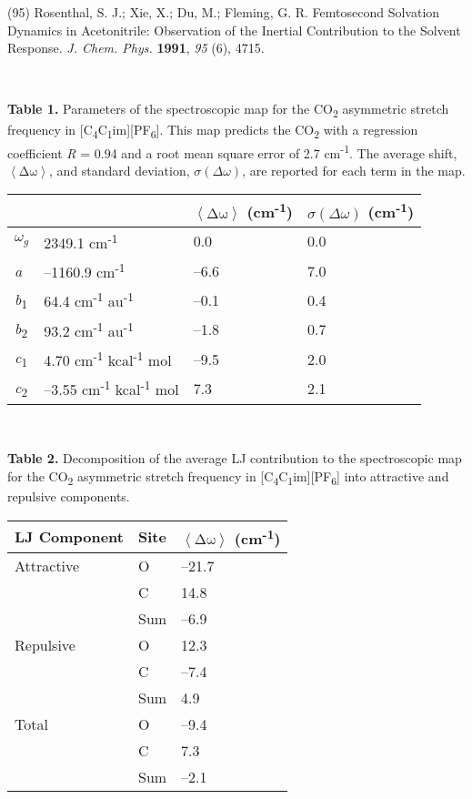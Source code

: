 \documentclass[]{article}
\begin{document}
(95) Rosenthal, S. J.; Xie, X.; Du, M.; Fleming, G. R. Femtosecond
Solvation Dynamics in Acetonitrile: Observation of the Inertial
Contribution to the Solvent Response. \emph{J. Chem. Phys.}
\textbf{1991}, \emph{95} (6), 4715.

\textbf{\\
}

\textbf{Table 1.} Parameters of the spectroscopic map for the
CO\textsubscript{2} asymmetric stretch frequency in
{[}C\textsubscript{4}C\textsubscript{1}im{]}{[}PF\textsubscript{6}{]}.
This map predicts the CO\textsubscript{2} with a regression coefficient
\emph{R} = 0.94 and a root mean square error of 2.7
cm\textsuperscript{-1}. The average shift,
\(\left\langle \text{Δω} \right\rangle\), and standard deviation,
\(\sigma(\Delta\omega)\), are reported for each term in the map.

\begin{longtable}[]{@{}llll@{}}
\toprule
& & \(\left\langle \text{Δω} \right\rangle\) (cm\textsuperscript{-1}) &
\(\sigma(\Delta\omega)\) (cm\textsuperscript{-1})\tabularnewline
\midrule
\endhead
\(\omega_{g}\) & 2349.1 cm\textsuperscript{-1} & 0.0 &
0.0\tabularnewline
\emph{a} & --1160.9 cm\textsuperscript{-1} & --6.6 & 7.0\tabularnewline
\emph{b}\textsubscript{1} & 64.4 cm\textsuperscript{-1}
au\textsuperscript{-1} & --0.1 & 0.4\tabularnewline
\emph{b}\textsubscript{2} & 93.2 cm\textsuperscript{-1}
au\textsuperscript{-1} & --1.8 & 0.7\tabularnewline
\emph{c}\textsubscript{1} & 4.70 cm\textsuperscript{-1}
kcal\textsuperscript{-1} mol & --9.5 & 2.0\tabularnewline
\emph{c}\textsubscript{2} & --3.55 cm\textsuperscript{-1}
kcal\textsuperscript{-1} mol & 7.3 & 2.1\tabularnewline
\bottomrule
\end{longtable}

\textbf{\\
}

\textbf{Table 2.} Decomposition of the average LJ contribution to the
spectroscopic map for the CO\textsubscript{2} asymmetric stretch
frequency in
{[}C\textsubscript{4}C\textsubscript{1}im{]}{[}PF\textsubscript{6}{]}
into attractive and repulsive components.

\begin{longtable}[]{@{}lll@{}}
\toprule
LJ Component & Site & \(\left\langle \text{Δω} \right\rangle\)
(cm\textsuperscript{-1})\tabularnewline
\midrule
\endhead
Attractive & O & --21.7\tabularnewline
& C & 14.8\tabularnewline
& Sum & --6.9\tabularnewline
Repulsive & O & 12.3\tabularnewline
& C & --7.4\tabularnewline
& Sum & 4.9\tabularnewline
Total & O & --9.4\tabularnewline
& C & 7.3\tabularnewline
& Sum & --2.1\tabularnewline
\bottomrule
\end{longtable}
\end{document}
